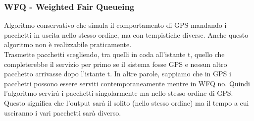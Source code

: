 \documentclass{article}
\begin{document}
\subsubsection{WFQ - Weighted Fair Queueing}
Algoritmo conservativo che simula il comportamento di GPS mandando i pacchetti in uscita nello stesso ordine, ma con tempistiche diverse. Anche questo algoritmo non è realizzabile praticamente.\\
Trasmette pacchetti scegliendo, tra quelli in coda all'istante t, quello che completerebbe il servizio per primo se il sistema fosse GPS e nessun altro pacchetto arrivasse dopo l'istante t. In altre parole, sappiamo che in GPS i pacchetti possono essere serviti contemporaneamente mentre in WFQ no. Quindi l'algoritmo servirà i pacchetti singolarmente ma nello stesso ordine di GPS. Questo significa che l'output sarà il solito (nello stesso ordine) ma il tempo a cui usciranno i vari pacchetti sarà diverso.
\end{document}
